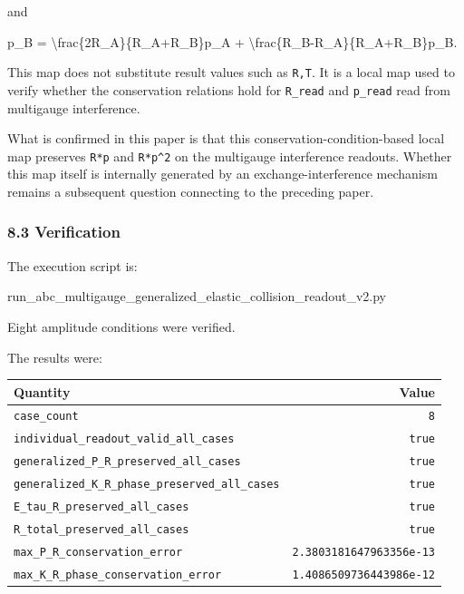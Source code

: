 \documentclass[
  a4paper,
]{article}
\newenvironment{Shaded}{}{}
\newcommand{\NormalTok}[1]{#1}
\newcounter{none} %
\begin{document}
and

\begin{Shaded}
\begin{Highlighting}[]
\NormalTok{p\_B\textquotesingle{}}
\NormalTok{=}
\NormalTok{\textbackslash{}frac\{2R\_A\}\{R\_A+R\_B\}p\_A}
\NormalTok{+}
\NormalTok{\textbackslash{}frac\{R\_B{-}R\_A\}\{R\_A+R\_B\}p\_B.}
\end{Highlighting}
\end{Shaded}

This map does not substitute result values such as \texttt{R,T}. It is a
local map used to verify whether the conservation relations hold for
\texttt{R\_read} and \texttt{p\_read} read from multigauge interference.

What is confirmed in this paper is that this
conservation-condition-based local map preserves \texttt{R*p} and
\texttt{R*p\^{}2} on the multigauge interference readouts. Whether this
map itself is internally generated by an exchange-interference mechanism
remains a subsequent question connecting to the preceding paper.

\subsubsection{8.3 Verification}\label{verification}

The execution script is:

\begin{Shaded}
\begin{Highlighting}[]
\NormalTok{run\_abc\_multigauge\_generalized\_elastic\_collision\_readout\_v2.py}
\end{Highlighting}
\end{Shaded}

Eight amplitude conditions were verified.

The results were:

{\def\LTcaptype{none} %
\begin{longtable}[]{@{}lr@{}}
\toprule\noalign{}
Quantity & Value \\
\midrule\noalign{}
\endhead
\bottomrule\noalign{}
\endlastfoot
\texttt{case\_count} & \texttt{8} \\
\texttt{individual\_readout\_valid\_all\_cases} & \texttt{true} \\
\texttt{generalized\_P\_R\_preserved\_all\_cases} & \texttt{true} \\
\texttt{generalized\_K\_R\_phase\_preserved\_all\_cases} &
\texttt{true} \\
\texttt{E\_tau\_R\_preserved\_all\_cases} & \texttt{true} \\
\texttt{R\_total\_preserved\_all\_cases} & \texttt{true} \\
\texttt{max\_P\_R\_conservation\_error} &
\texttt{2.3803181647963356e-13} \\
\texttt{max\_K\_R\_phase\_conservation\_error} &
\texttt{1.4086509736443986e-12} \\
\end{longtable}
}
\end{document}
